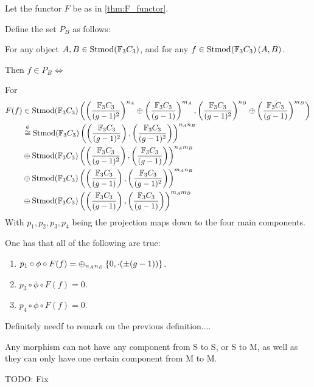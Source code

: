 \begin{definition} %
    Let the functor \( F \) be as in \autoref{thm:F_functor}.

    Define the set \( P_B \) as follows:

    For any object \( A, B \in \operatorname{Stmod}({\mathbb{F}}_3C_3) \), and for any \( f \in \operatorname{Stmod}({\mathbb{F}}_3C_3)\left(A, B\right) \).

    Then \( f \in P_B \iff \)

    For
    \begin{align*}
        F(f) &\in \operatorname{Stmod}({\mathbb{F}}_3C_3)\left(\left( \frac{{\mathbb{F}}_3C_3}{(g - 1)^2} \right)^{n_A} \oplus \left( \frac{{\mathbb{F}}_3C_3}{(g - 1)} \right)^{m_A}, \left( \frac{{\mathbb{F}}_3C_3}{(g - 1)^2} \right)^{n_B} \oplus \left( \frac{{\mathbb{F}}_3C_3}{(g - 1)} \right)^{m_B}\right) \\
        &\stackrel{\phi}{\cong} \operatorname{Stmod}({\mathbb{F}}_3C_3)\left( \left( \frac{{\mathbb{F}}_3C_3}{(g - 1)^2} \right), \left( \frac{{\mathbb{F}}_3C_3}{(g - 1)^2} \right) \right)^{n_An_B} \\
        &\oplus \operatorname{Stmod}({\mathbb{F}}_3C_3)\left( \left( \frac{{\mathbb{F}}_3C_3}{(g - 1)^2} \right), \left( \frac{{\mathbb{F}}_3C_3}{(g - 1)} \right) \right)^{n_Am_B} \\
        &\oplus \operatorname{Stmod}({\mathbb{F}}_3C_3)\left( \left( \frac{{\mathbb{F}}_3C_3}{(g - 1)} \right), \left( \frac{{\mathbb{F}}_3C_3}{(g - 1)^2} \right) \right)^{m_An_B} \\
        &\oplus \operatorname{Stmod}({\mathbb{F}}_3C_3)\left( \left( \frac{{\mathbb{F}}_3C_3}{(g - 1)} \right), \left( \frac{{\mathbb{F}}_3C_3}{(g - 1)} \right) \right)^{m_Am_B}
    \end{align*}
    With \( p_1, p_2, p_3, p_4 \) being the projection maps down to the four main components.

    One has that all of the following are true:
    \begin{enumerate}
        \item {
            \( p_1 \circ \phi \circ F(f) = \oplus_{n_An_B} \left\{0, \cdot(\pm (g - 1))\right\} \).
        }
        \item {
            \( p_3 \circ \phi \circ F(f) = 0 \).
        }
        \item {
            \( p_4 \circ \phi \circ F(f) = 0 \).
        }
    \end{enumerate}
\end{definition}

\begin{remark}
    Definitely needf to remark on the previous definition.... 
    
    Any morphism can not have any component from S to S, or S to M, as well as they can only have one certain component from M to M.

    TODO: Fix
\end{remark}

